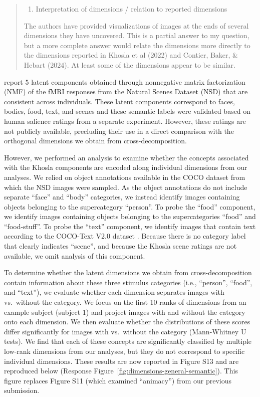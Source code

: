 \documentclass[10pt]{article}
\providecommand{\tightlist}{\setlength{\itemsep}{0pt}\setlength{\parskip}{0pt}}
\begin{document}
\begin{quote}
\begin{enumerate}
\def\labelenumi{\arabic{enumi}.}
\setcounter{enumi}{1}
\tightlist
\item
  Interpretation of dimensions / relation to reported dimensions
\end{enumerate}

The authors have provided visualizations of images at the ends of several dimensions they have uncovered. This is a partial answer to my question, but a more complete answer would relate the dimensions more directly to the dimensions reported in Khosla et al (2022) and Contier, Baker, \& Hebart (2024). At least some of the dimensions appear to be similar.
\end{quote}

\textcite{Khosla2022} report 5 latent components obtained through nonnegative matrix factorization (NMF) of the fMRI responses from the Natural Scenes Dataset (NSD) that are consistent across individuals. These latent components correspond to faces, bodies, food, text, and scenes and these semantic labels were validated based on human salience ratings from a separate experiment. However, these ratings are not publicly available, precluding their use in a direct comparison with the orthogonal dimensions we obtain from cross-decomposition.

However, we performed an analysis to examine whether the concepts associated with the Khosla components are encoded along individual dimensions from our analyses. We relied on object annotations available in the COCO dataset \autocite{Lin2014} from which the NSD images were sampled. As the object annotations do not include separate ``face'' and ``body'' categories, we instead identify images containing objects belonging to the supercategory ``person''. To probe the ``food'' component, we identify images containing objects belonging to the supercategories ``food'' and ``food-stuff''. To probe the ``text'' component, we identify images that contain text according to the COCO-Text V2.0 dataset \autocite{Veit2016}. Because there is no category label that clearly indicates ``scene'', and because the Khosla scene ratings are not available, we omit analysis of this component.

To determine whether the latent dimensions we obtain from cross-decomposition contain information about these three stimulus categories (i.e., ``person'', ``food'', and ``text''), we evaluate whether each dimension separates images with vs.~without the category. We focus on the first 10 ranks of dimensions from an example subject (subject 1) and project images with and without the category onto each dimension. We then evaluate whether the distributions of these scores differ significantly for images with vs.~without the category (Mann-Whitney U tests). We find that each of these concepts are significantly classified by multiple low-rank dimensions from our analyses, but they do not correspond to specific individual dimensions. These results are now reported in Figure S13 and are reproduced below (Response Figure~\ref{fig:dimensions-general-semantic}). This figure replaces Figure S11 (which examined ``animacy'') from our previous submission.
\end{document}
